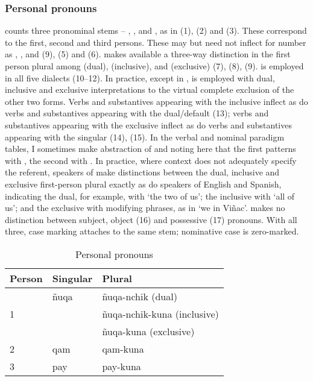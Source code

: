 \subsubsection{Personal pronouns }\label{ssec:ppnqp}
\SYQ{} counts three pronominal stems -- , , and , as in (1), (2) and (3). These correspond to the first, second and third persons. These may but need not inflect for number as , , and  (9), (5) and (6). \SYQ{} makes available a three-way distinction in the first person plural among  (dual),  (inclusive), and  (exclusive) (7), (8), (9).  is employed in all five dialects (10--12). In practice, except in \CH{},  is employed with dual, inclusive and exclusive interpretations to the virtual complete exclusion of the other two forms. Verbs and substantives appearing with the inclusive  inflect as do verbs and substantives appearing with the dual/default  (13); verbs and substantives appearing with the exclusive  inflect as do verbs and substantives appearing with the singular  (14), (15). In the verbal and nominal paradigm tables, I sometimes make abstraction of  and  noting here that the first patterns with , the second with . In practice, where context does not adequately specify the referent, speakers of \SYQ{} make distinctions between the dual, inclusive and exclusive first-person plural exactly as do speakers of English and Spanish, indicating the dual, for example, with  `the two of us'; the inclusive with  `all of us'; and the exclusive with modifying phrases, as in  `we in Vi\~nac'. \SYQ{} makes no distinction between subject, object (16) and possessive (17) pronouns. With all three, case marking attaches to the same stem; nominative case is zero-marked.

\begin{table}[!ht]
\caption{Personal pronouns}\label{Tab8}
\begin{small}
\begin{center}
\begin{tabular}{lll}
\toprule
Person & Singular & Plural\\
\midrule
\multirow{3}{*}{1} 	& \~nuqa 	& \~nuqa-nchik (dual)		\\
	& 			& \~nuqa-nchik-kuna (inclusive)	\\
	& 			& \~nuqa-kuna (exclusive)	\\
2 	& qam 		& qam-kuna			\\
3 	& pay 		& pay-kuna\\
\bottomrule
\end{tabular}
\end{center}
\end{small}
\end{table}

